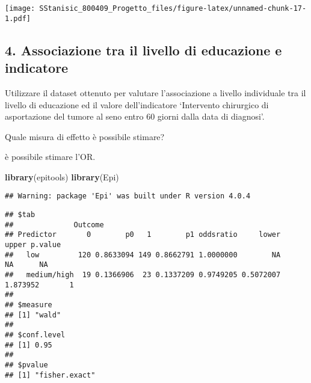 \documentclass[]{article}
\newenvironment{Shaded}{\begin{snugshade}}{\end{snugshade}}
\newcommand{\DataTypeTok}[1]{\textcolor[rgb]{0.13,0.29,0.53}{#1}}
\newcommand{\KeywordTok}[1]{\textcolor[rgb]{0.13,0.29,0.53}{\textbf{#1}}}
\newcommand{\NormalTok}[1]{#1}
\newcommand{\OperatorTok}[1]{\textcolor[rgb]{0.81,0.36,0.00}{\textbf{#1}}}
\newcommand{\StringTok}[1]{\textcolor[rgb]{0.31,0.60,0.02}{#1}}
\begin{document}
\texttt{[image: SStanisic\_800409\_Progetto\_files/figure-latex/unnamed-chunk-17-1.pdf]}

\hypertarget{associazione-tra-il-livello-di-educazione-e-indicatore}{%
\subsection{4. Associazione tra il livello di educazione e
indicatore}\label{associazione-tra-il-livello-di-educazione-e-indicatore}}

Utilizzare il dataset ottenuto per valutare l'associazione a livello
individuale tra il livello di educazione ed il valore dell'indicatore
`Intervento chirurgico di asportazione del tumore al seno entro 60
giorni dalla data di diagnosi'.

Quale misura di effetto è possibile stimare?

è possibile stimare l'OR.

\begin{Shaded}
\begin{Highlighting}[]
\KeywordTok{library}\NormalTok{(epitools)}
\KeywordTok{library}\NormalTok{(Epi)}
\end{Highlighting}
\end{Shaded}

\begin{verbatim}
## Warning: package 'Epi' was built under R version 4.0.4
\end{verbatim}

\begin{Shaded}
\end{Shaded}

\begin{verbatim}
## $tab
##              Outcome
## Predictor       0        p0   1        p1 oddsratio     lower    upper p.value
##   low         120 0.8633094 149 0.8662791 1.0000000        NA       NA      NA
##   medium/high  19 0.1366906  23 0.1337209 0.9749205 0.5072007 1.873952       1
## 
## $measure
## [1] "wald"
## 
## $conf.level
## [1] 0.95
## 
## $pvalue
## [1] "fisher.exact"
\end{verbatim}
\end{document}
